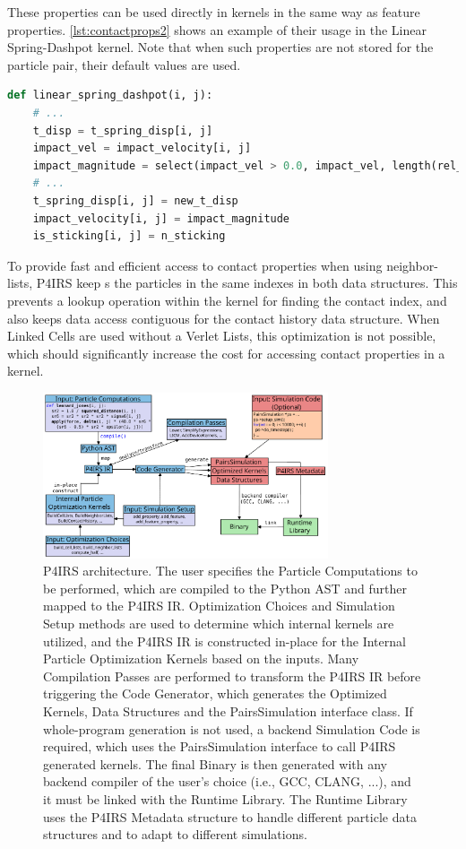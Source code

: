 \documentclass[Afour,sageh,times]{sagej}
\newcommand{\RMchange}[1]{{\color{blue} #1}}
\begin{document}
These properties can be used directly in kernels in the same way as feature properties.
\autoref{lst:contactprops2} shows an example of their usage in the Linear Spring-Dashpot kernel.
Note that when such properties are not stored for the particle pair, their default values are used.

\begin{lstlisting}[language=Python,
		   label={lst:contactprops2},
		   caption={Contact properties usage example.}]
def linear_spring_dashpot(i, j):
    # ...
    t_disp = t_spring_disp[i, j]
    impact_vel = impact_velocity[i, j]
    impact_magnitude = select(impact_vel > 0.0, impact_vel, length(rel_vel))
    # ...
    t_spring_disp[i, j] = new_t_disp
    impact_velocity[i, j] = impact_magnitude
    is_sticking[i, j] = n_sticking
\end{lstlisting}

To provide fast and efficient \RMchange{access to} contact properties when using neighbor-lists, P4IRS keep\RMchange{s} the particles in the same indexes in both data structures.
This prevents a lookup operation within the kernel for finding the contact index, and also keeps data access contiguous for the contact history data structure.
When Linked Cells are used without a Verlet Lists, this optimization is not possible, which should significantly increase the cost for accessing contact properties in a kernel.

\begin{figure}[htb]
  \centering
  \includegraphics[width=0.75\textwidth]{pairs_architecture.pdf}
  \caption{\RMchange{P4IRS architecture. The user specifies the Particle Computations to be performed, which are compiled to the Python AST and further mapped to the P4IRS IR. Optimization Choices and Simulation Setup methods are used to determine which internal kernels are utilized, and the P4IRS IR is constructed in-place for the Internal Particle Optimization Kernels based on the inputs. Many Compilation Passes are performed to transform the P4IRS IR before triggering the Code Generator, which generates the Optimized Kernels, Data Structures and the PairsSimulation interface class. If whole-program generation is not used, a backend Simulation Code is required, which uses the PairsSimulation interface to call P4IRS generated kernels. The final Binary is then generated with any backend compiler of the user's choice (i.e., GCC, CLANG, ...), and it must be linked with the Runtime Library. The Runtime Library uses the P4IRS Metadata structure to handle different particle data structures and to adapt to different simulations.}}
  \label{fig:pairs_arch}
\end{figure}
\end{document}
